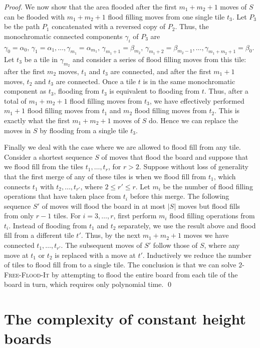 \documentclass[a4paper,11pt]{llncs}
\newcounter{l}
\renewcommand{\leq}{\leqslant}
\newcommand{\ColoroidFree}[1]{$#1$-\textsc{Free-Flood-It}}
\begin{document}
\begin{proof}
    We now show that the area flooded after the first $m_1+m_2+1$ moves of $S$ can be flooded with $m_1+m_2+1$ flood filling moves from one single tile $t_3$. Let $P_3$ be the path $P_1$ concatenated with a reversed copy of $P_2$. Thus, the monochromatic connected components $\gamma_i$ of $P_3$ are $\gamma_0=\alpha_0,\, \gamma_1=\alpha_1,\dots, \gamma_{m_1}=\alpha_{m_1},\, \gamma_{m_1+1}=\beta_{m_2},\, \gamma_{m_1+2}=\beta_{m_2-1}, \dots, \gamma_{m_1+m_2+1}=\beta_0$. Let $t_3$ be a tile in $\gamma_{m_2}$ and consider a series of flood filling moves from this tile: after the first $m_2$ moves, $t_1$ and $t_3$ are connected, and after the first $m_1+1$ moves, $t_2$ and $t_3$ are connected. Once a tile $t$ is in the same monochromatic component as $t_3$, flooding from $t_3$ is equivalent to flooding from $t$. Thus, after a total of $m_1+m_2+1$ flood filling moves from $t_3$, we have effectively performed $m_1+1$ flood filling moves from $t_1$ and $m_2$ flood filling moves from $t_2$. This is exactly what the first $m_1+m_2+1$ moves of $S$ do. Hence we can replace the moves in $S$ by flooding from a single tile $t_3$.

    Finally we deal with the case where we are allowed to flood fill from any tile. Consider a shortest sequence $S$ of moves that flood the board and suppose that we flood fill from the tiles $t_1,\dots,t_r$, for $r>2$. Suppose without loss of generality that the first merge of any of these tiles is when we flood fill from $t_1$, which connects $t_1$ with $t_2,\dots,t_{r'}$, where $2\leq r'\leq r$. Let $m_i$ be the number of flood filling operations that have taken place from $t_i$ before this merge. The following sequence $S'$ of moves will flood the board in at most $|S|$ moves but flood fills from only $r-1$ tiles. For $i=3,\dots,r$, first perform $m_i$ flood filling operations from $t_i$. Instead of flooding from $t_1$ and $t_2$ separately, we use the result above and flood fill from a different tile $t'$. Thus, by the next $m_1+m_2+1$ moves we have connected $t_1,\dots,t_{r'}$. The subsequent moves of $S'$ follow those of $S$, where any move at $t_1$ or $t_2$ is replaced with a move at $t'$. Inductively we reduce the number of tiles to flood fill from to a single tile. The conclusion is that we can solve \ColoroidFree{2} by attempting to flood the entire board from each tile of the board in turn, which requires only polynomial time.
    \qed
\end{proof}

\section{The complexity of constant height boards} \label{sec:shape}
\end{document}
